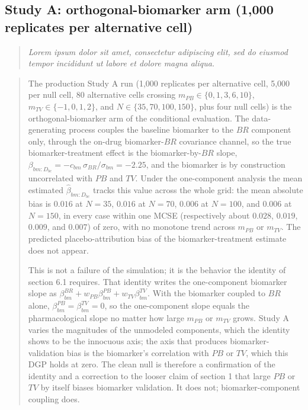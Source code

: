 \documentclass[
  11pt,
]{article}
\newenvironment{rgt}{%
  \begin{quote}\small\itshape\color[RGB]{20,60,160}}{%
  \end{quote}}
\newenvironment{orig}{%
  \begin{quote}\normalsize\color[gray]{0.55}}{%
  \end{quote}}
\begin{document}
\subsection{Study A: orthogonal-biomarker arm (1,000 replicates per alternative cell)}\label{study-a-orthogonal-biomarker-arm-1000-replicates-per-alternative-cell}

\begin{rgt}
Lorem ipsum dolor sit amet, consectetur adipiscing elit, sed do eiusmod tempor incididunt ut labore et dolore magna aliqua.

\end{rgt}

\begin{orig}
The production Study A run (1,000 replicates per alternative cell,
5,000 per null cell, 80 alternative cells crossing
\(m_{PB} \in \{0,1,3,6,10\}\), \(m_{TV} \in \{-1,0,1,2\}\), and
\(N \in \{35,70,100,150\}\), plus four null cells) is the
orthogonal-biomarker arm of the conditional evaluation.
The data-generating process couples the baseline biomarker to the
\(BR\) component only, through the on-drug biomarker-\(BR\) covariance
channel, so the true biomarker-treatment effect is the
biomarker-by-\(BR\) slope,
\(\beta_{bm:D_{bc}} = -c_{bm}\,\sigma_{BR}/\sigma_{bm} = -2.25\), and
the biomarker is by construction uncorrelated with \(PB\) and \(TV\).
Under the one-component analysis the mean estimated
\(\hat\beta_{bm:D_{bc}}\) tracks this value across the whole grid:
the mean absolute bias is \(0.016\) at \(N=35\), \(0.016\) at \(N=70\),
\(0.006\) at \(N=100\), and \(0.006\) at \(N=150\), in every case within
one MCSE (respectively about \(0.028\),
\(0.019\), \(0.009\), and \(0.007\)) of zero, with no monotone trend
across \(m_{PB}\) or \(m_{TV}\). The predicted placebo-attribution
bias of the biomarker-treatment estimate does not appear.

This is not a failure of the simulation; it is the behavior the
identity of section 6.1 requires. That identity writes the one-component
biomarker slope as \(\beta_{bm}^{BR} + w_{PB}\beta_{bm}^{PB} +
w_{TV}\beta_{bm}^{TV}\). With the biomarker coupled to \(BR\) alone,
\(\beta_{bm}^{PB} = \beta_{bm}^{TV} = 0\), so the one-component slope equals
the pharmacological slope no matter how large \(m_{PB}\) or \(m_{TV}\)
grows. Study A varies the magnitudes of the unmodeled components,
which the identity shows to be the innocuous axis; the axis that
produces biomarker-validation bias is the biomarker's correlation
with \(PB\) or \(TV\), which this DGP holds at zero. The clean null is
therefore a confirmation of the identity and a correction to the
looser claim of section 1 that large \(PB\) or \(TV\) by itself biases
biomarker validation. It does not; biomarker-component coupling
does.

\end{orig}
\end{document}
